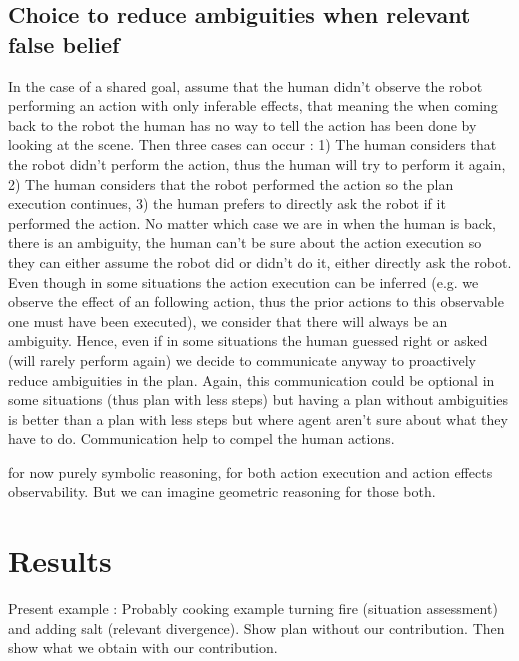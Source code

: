 \documentclass[letterpaper]{article} %
\begin{document}
\subsection{Choice to reduce ambiguities when relevant false belief}
In the case of a shared goal, assume that the human didn't observe the robot performing an action with only inferable effects, that meaning the when coming back to the robot the human has no way to tell the action has been done by looking at the scene. Then three cases can occur : 1) The human considers that the robot didn't perform the action, thus the human will try to perform it again, 2) The human considers that the robot performed the action so the plan execution continues, 3) the human prefers to directly ask the robot if it performed the action. No matter which case we are in when the human is back, there is an ambiguity, the human can't be sure about the action execution so they can either assume the robot did or didn't do it, either directly ask the robot. Even though in some situations the action execution can be inferred (e.g. we observe the effect of an following action, thus the prior actions to this observable one must have been executed), we consider that there will always be an ambiguity. Hence, even if in some situations the human guessed right or asked (will rarely perform again) we decide to communicate anyway to proactively reduce ambiguities in the plan. Again, this communication could be optional in some situations (thus plan with less steps) but having a plan without ambiguities is better than a plan with less steps but where agent aren't sure about what they have to do. Communication help to compel the human actions.


for now purely symbolic reasoning, for both action execution and action effects observability. But we can imagine geometric reasoning for those both.

\section{Results}

Present example : Probably cooking example turning fire (situation assessment) and adding salt (relevant divergence). Show plan without our contribution. Then show what we obtain with our contribution.
\end{document}
